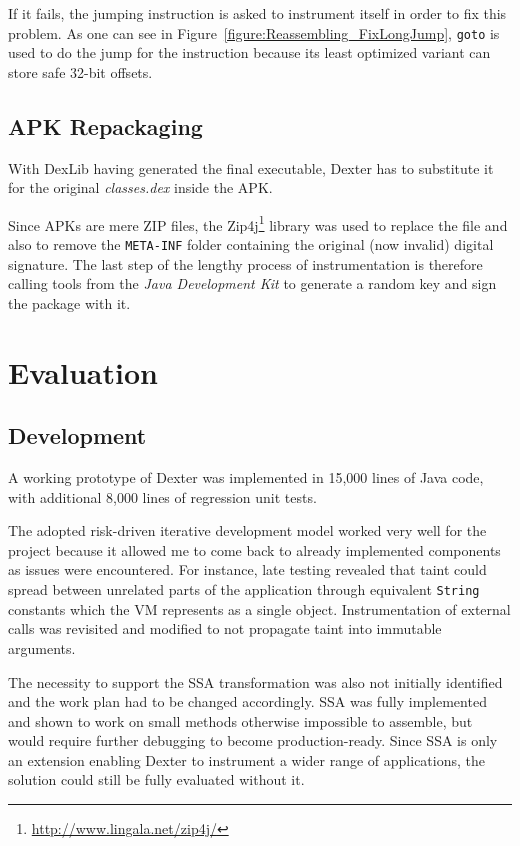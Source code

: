 \documentclass[12pt,twoside,notitlepage]{report}
\newcommand{\weblink}[1] {\footnote{\scriptsize\url{#1}}}
\begin{document}
\parbox{\textwidth}{
If it fails, the jumping instruction is asked to instrument itself in order to fix this problem. As one can see in Figure~\ref{figure:Reassembling_FixLongJump}, \texttt{goto} is used to do the jump for the instruction because its least optimized variant can store safe 32-bit offsets.
}

\section{APK Repackaging}

With DexLib having generated the final executable, Dexter has to substitute it for the original \emph{classes.dex} inside the APK. 

Since APKs are mere ZIP files, the Zip4j\weblink{http://www.lingala.net/zip4j/} library was used to replace the file and also to remove the \verb$META-INF$ folder containing the original (now invalid) digital signature. The last step of the lengthy process of instrumentation is therefore calling tools from the \emph{Java Development Kit} to generate a random key and sign the package with it.

\cleardoublepage
\chapter{Evaluation}

\section{Development}

A working prototype of Dexter was implemented in 15,000 lines of Java code, with additional 8,000 lines of regression unit tests. 

The adopted risk-driven iterative development model worked very well for the project because it allowed me to come back to already implemented components as issues were encountered. For instance, late testing revealed that taint could spread between unrelated parts of the application through equivalent \texttt{String} constants which the VM represents as a single object. Instrumentation of external calls was revisited and modified to not propagate taint into immutable arguments. 

The necessity to support the SSA transformation was also not initially identified and the work plan had to be changed accordingly. SSA was fully implemented and shown to work on small methods otherwise impossible to assemble, but would require further debugging to become production-ready. Since SSA is only an extension enabling Dexter to instrument a wider range of applications, the solution could still be fully evaluated without it.
\end{document}
